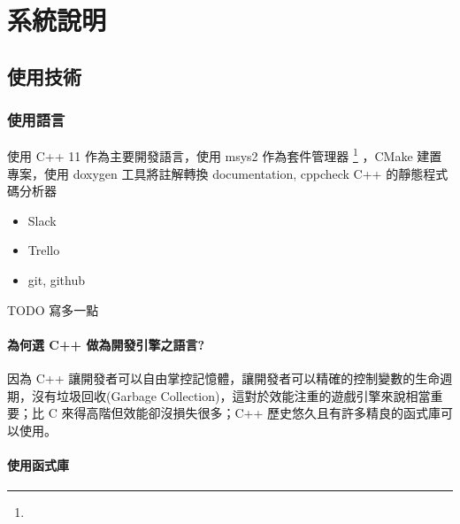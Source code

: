 \chapter{系統說明}

\section{使用技術}

\subsection{使用語言}

使用 C++ 11 作為主要開發語言，使用 msys2 作為套件管理器 \footnote{} ，CMake 建置專案，使用 doxygen 工具將註解轉換 documentation, cppcheck C++ 的靜態程式碼分析器

\begin{itemize}
	\item{Slack}
	\item{Trello}
	\item{git, github}
\end{itemize}

TODO 寫多一點

\subsubsection{為何選 C++ 做為開發引擎之語言?}

因為 C++ 讓開發者可以自由掌控記憶體，讓開發者可以精確的控制變數的生命週期，沒有垃圾回收(Garbage Collection)，這對於效能注重的遊戲引擎來說相當重要；比 C 來得高階但效能卻沒損失很多；C++ 歷史悠久且有許多精良的函式庫可以使用。


\subsubsection{使用函式庫}

